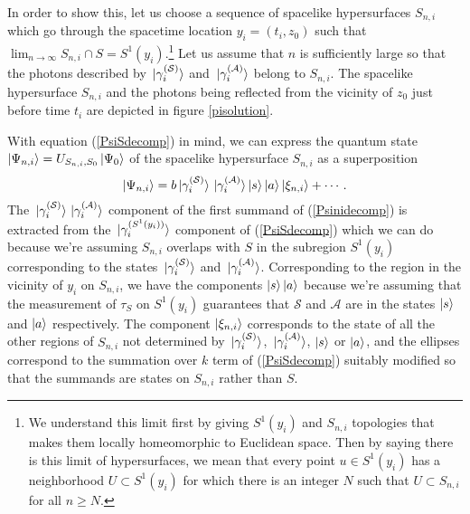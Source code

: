 In order to show this, let us choose a sequence of spacelike hypersurfaces $S_{n,i}$ which go through the spacetime location $y_i=(t_i, z_0)$ such that $\lim_{n\rightarrow\infty} S_{n,i}\cap S=S^1(y_i).$\footnote{We understand this limit first by giving $S^1(y_i)$ and $S_{n,i}$  topologies that makes them locally homeomorphic to Euclidean space. Then by saying there is this limit of hypersurfaces, we mean that every point $u\in S^1(y_i)$ has a neighborhood $U\subset S^1(y_i)$ for which there is an integer $N$ such that $U\subset S_{n,i}$ for all $n\geq N$.} Let us assume that $n$ is sufficiently large so that the photons described by $\ket*{\gamma_i^{(\mathcal{S})}}$ and $\ket*{\gamma_i^{(\mathcal{A})}}$ belong to $S_{n,i}$. The spacelike hypersurface $S_{n,i}$ and the photons being reflected from the vicinity of $z_0$ just before time $t_i$ are  depicted in figure \ref{pisolution}.

With equation (\ref{PsiSdecomp}) in mind, we can express the quantum state $\ket{\Psi_{n,i}}=U_{S_{n,i},S_0}\ket{\Psi_0}$  of the spacelike hypersurface $S_{n,i}$ as a superposition 
\begin{equation}\label{Psinidecomp}
\ket{\Psi_{n,i}}=b\ket*{\gamma_i^{(\mathcal{S})}}\ket*{\gamma_i^{(\mathcal{A})}}\ket{s}\ket{a}\ket{\xi_{n,i}}+\cdots.
\end{equation} 
The $\ket*{\gamma_i^{(\mathcal{S})}}\ket*{\gamma_i^{(\mathcal{A})}}$ component of the first summand of (\ref{Psinidecomp}) is extracted from the $\ket*{\gamma_i^{(S^1(y_i))}}$ component of (\ref{PsiSdecomp}) which we can do because we're assuming $S_{n,i}$ overlaps with $S$ in the subregion $S^1(y_i)$ corresponding to the states $\ket*{\gamma_i^{(\mathcal{S})}}$ and $\ket*{\gamma_i^{(\mathcal{A})}}$. Corresponding to the region in the vicinity of $y_i$ on $S_{n,i}$, we have the components $\ket{s}\ket{a}$ because we're assuming that the measurement of $\tau_S$ on $S^1(y_i)$ guarantees that $\mathcal{S}$ and $\mathcal{A}$ are in the states $\ket{s}$ and $\ket{a}$ respectively. The component $\ket{\xi_{n,i}}$ corresponds to the state of all the other regions of $S_{n,i}$ not determined by $\ket*{\gamma_i^{(\mathcal{S})}}$, $\ket*{\gamma_i^{(\mathcal{A})}}$, $\ket{s}$ or $\ket{a}$, and the ellipses correspond to the summation over $k$ term of (\ref{PsiSdecomp}) suitably modified so that the summands are states on $S_{n,i}$ rather than $S$.

